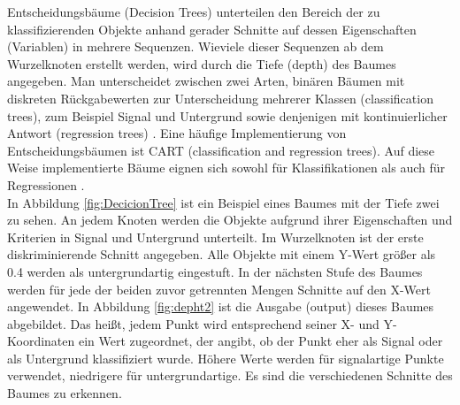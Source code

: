 Entscheidungsb\"aume (Decision Trees) unterteilen den Bereich der zu klassifizierenden Objekte anhand gerader Schnitte auf dessen Eigenschaften (Variablen) in mehrere Sequenzen. Wieviele dieser Sequenzen ab dem Wurzelknoten erstellt werden, wird durch die Tiefe (depth) des Baumes angegeben. Man unterscheidet zwischen zwei Arten, bin\"aren B\"aumen mit diskreten R\"uckgabewerten zur Unterscheidung mehrerer Klassen (classification trees), zum Beispiel Signal und Untergrund sowie denjenigen mit kontinuierlicher Antwort (regression trees) \cite{SWB-455193959}. Eine h\"aufige Implementierung von Entscheidungsb\"aumen ist CART (classification and regression trees). Auf diese Weise implementierte B\"aume eignen sich sowohl f\"ur Klassifikationen als auch f\"ur Regressionen \cite{CART}.\\
In Abbildung \ref{fig:DecicionTree} ist ein Beispiel eines Baumes mit der Tiefe zwei zu sehen. An jedem Knoten werden die Objekte aufgrund ihrer Eigenschaften und Kriterien in Signal und Untergrund unterteilt. Im Wurzelknoten ist der erste diskriminierende Schnitt angegeben. Alle Objekte mit einem Y-Wert gr\"o\ss er als \num{0,4} werden als untergrundartig eingestuft. In der n\"achsten Stufe des Baumes werden f\"ur jede der beiden zuvor getrennten Mengen Schnitte auf den X-Wert angewendet. In Abbildung \ref{fig:depht2} ist die Ausgabe (output) dieses Baumes abgebildet. Das hei\ss t, jedem Punkt wird entsprechend seiner X- und Y-Koordinaten ein Wert zugeordnet, der angibt, ob der Punkt eher als Signal oder als Untergrund klassifiziert wurde. H\"ohere Werte werden f\"ur signalartige Punkte verwendet, niedrigere f\"ur untergrundartige. Es sind die verschiedenen Schnitte des Baumes zu erkennen.\\

